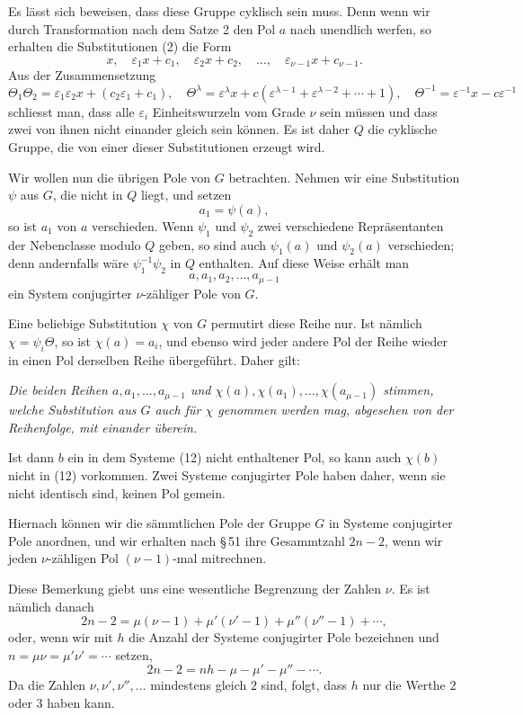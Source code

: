 \documentclass[11pt]{article}
\providecommand{\eps}{\varepsilon}
\providecommand{\eps}{\varepsilon}
\begin{document}
Es lässt sich beweisen, dass diese Gruppe cyklisch sein muss. Denn wenn wir durch Transformation nach dem Satze 2 den Pol $a$ nach unendlich werfen, so erhalten die Substitutionen (2) die Form
\[
x,\quad \eps_1x+c_1,\quad \eps_2x+c_2,
\quad \ldots,\quad \eps_{\nu-1}x+c_{\nu-1}.
\]
Aus der Zusammensetzung
\[
\Theta_1\Theta_2=\eps_1\eps_2x+(c_2\eps_1+c_1),\quad
\Theta^\lambda=\eps^\lambda x+c(\eps^{\lambda-1}+\eps^{\lambda-2}+\cdots+1),
\quad \Theta^{-1}=\eps^{-1}x-c\eps^{-1}
\]
schliesst man, dass alle $\eps_i$ Einheitswurzeln vom Grade $\nu$ sein müssen und dass zwei von ihnen nicht einander gleich sein können. Es ist daher $Q$ die cyklische Gruppe, die von einer dieser Substitutionen erzeugt wird.

Wir wollen nun die übrigen Pole von $G$ betrachten. Nehmen wir eine Substitution $\psi$ aus $G$, die nicht in $Q$ liegt, und setzen
\begin{equation}
a_1=\psi(a),
\tag{4}
\end{equation}
so ist $a_1$ von $a$ verschieden. Wenn $\psi_1$ und $\psi_2$ zwei verschiedene Repräsentanten der Nebenclasse modulo $Q$ geben, so sind auch $\psi_1(a)$ und $\psi_2(a)$ verschieden; denn andernfalls wäre $\psi_1^{-1}\psi_2$ in $Q$ enthalten. Auf diese Weise erhält man
\begin{equation}
a,a_1,a_2,\ldots,a_{\mu-1}
\tag{12}
\end{equation}
ein System conjugirter $\nu$-zähliger Pole von $G$.

Eine beliebige Substitution $\chi$ von $G$ permutirt diese Reihe nur. Ist nämlich $\chi=\psi_i\Theta$, so ist $\chi(a)=a_i$, und ebenso wird jeder andere Pol der Reihe wieder in einen Pol derselben Reihe übergeführt. Daher gilt:

\emph{Die beiden Reihen $a,a_1,\ldots,a_{\mu-1}$ und $\chi(a),\chi(a_1),\ldots,\chi(a_{\mu-1})$ stimmen, welche Substitution aus $G$ auch für $\chi$ genommen werden mag, abgesehen von der Reihenfolge, mit einander überein.}

Ist dann $b$ ein in dem Systeme (12) nicht enthaltener Pol, so kann auch $\chi(b)$ nicht in (12) vorkommen. Zwei Systeme conjugirter Pole haben daher, wenn sie nicht identisch sind, keinen Pol gemein.

Hiernach können wir die sämmtlichen Pole der Gruppe $G$ in Systeme conjugirter Pole anordnen, und wir erhalten nach \S\,51 ihre Gesammtzahl $2n-2$, wenn wir jeden $\nu$-zähligen Pol $(\nu-1)$-mal mitrechnen.

Diese Bemerkung giebt uns eine wesentliche Begrenzung der Zahlen $\nu$. Es ist nämlich danach
\begin{equation}
2n-2=\mu(\nu-1)+\mu'(\nu'-1)+\mu''(\nu''-1)+\cdots,
\tag{13}
\end{equation}
oder, wenn wir mit $h$ die Anzahl der Systeme conjugirter Pole bezeichnen und $n=\mu\nu=\mu'\nu'=\cdots$ setzen,
\begin{equation}
2n-2=nh-\mu-\mu'-\mu''-\cdots.
\tag{14}
\end{equation}
Da die Zahlen $\nu,\nu',\nu'',\ldots$ mindestens gleich $2$ sind, folgt, dass $h$ nur die Werthe $2$ oder $3$ haben kann.
\end{document}
